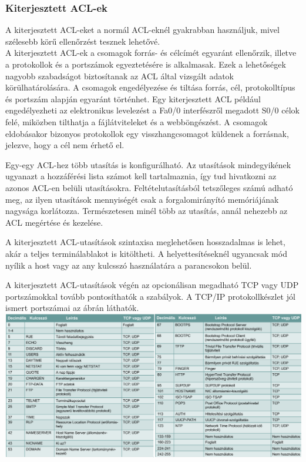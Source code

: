 \subsubsection{Kiterjesztett ACL-ek}
A kiterjesztett ACL-eket a normál ACL-eknél gyakrabban használjuk, mivel szélesebb körű
ellenőrzést tesznek lehetővé.\\
A kiterjesztett ACL-ek a csomagok forrás- és célcímét egyaránt ellenőrzik, illetve a
protokollok és a portszámok egyeztetésére is alkalmasak. Ezek a lehetőségek nagyobb
szabadságot biztosítanak az ACL által vizsgált adatok körülhatárolására. A csomagok
engedélyezése és tiltása forrás, cél, protokolltípus és portszám alapján egyaránt történhet.
Egy kiterjesztett ACL például engedélyezheti az elektronikus levelezést a Fa0/0 interfészről
megadott S0/0 célok felé, miközben tilthatja a fájlátviteleket és a webböngészést. A csomagok
eldobásakor bizonyos protokollok egy visszhangcsomagot küldenek a forrásnak, jelezve, hogy
a cél nem érhető el.

Egy-egy ACL-hez több utasítás is konfigurálható. Az utasítások mindegyikének ugyanazt a
hozzáférési lista számot kell tartalmaznia, így tud hivatkozni az azonos ACL-en belüli
utasításokra. Feltételutasításból tetszőleges számú adható meg, az ilyen utasítások
mennyiségét csak a forgalomirányító memóriájának nagysága korlátozza. Természetesen
minél több az utasítás, annál nehezebb az ACL megértése és kezelése.

A kiterjesztett ACL-utasítások szintaxisa meglehetősen hosszadalmas is lehet, akár a teljes
terminálablakot is kitöltheti. A helyettesítéseknél ugyancsak mód nyílik a host vagy az any
kulcsszó használatára a parancsokon belül.

A kiterjesztett ACL-utasítások végén az opcionálisan megadható TCP vagy UDP
portszámokkal tovább pontosíthatók a szabályok. A TCP/IP protokollkészlet jól ismert
portszámai az ábrán láthatók.\\
{\centering
\includegraphics[width=\linewidth]{fig/16-extACL-TCPIP_protocolls}}

